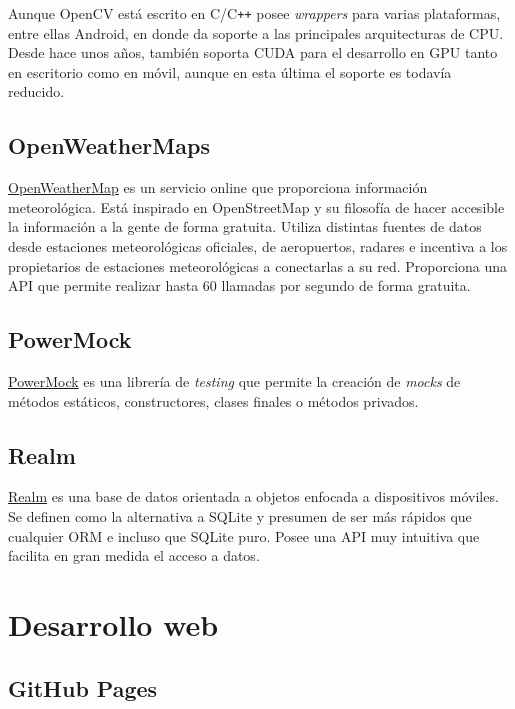 Aunque OpenCV está escrito en C/C\texttt{++} posee \emph{wrappers} para varias
plataformas, entre ellas Android, en donde da soporte a las principales
arquitecturas de CPU. Desde hace unos años, también soporta CUDA para el
desarrollo en GPU tanto en escritorio como en móvil, aunque en esta
última el soporte es todavía reducido.

\subsection{OpenWeatherMaps}\label{openweathermaps}

\href{http://openweathermap.org/}{OpenWeatherMap} es un servicio online
que proporciona información meteorológica. Está inspirado en
OpenStreetMap y su filosofía de hacer accesible la información a la
gente de forma gratuita. Utiliza distintas fuentes de datos desde
estaciones meteorológicas oficiales, de aeropuertos, radares e incentiva
a los propietarios de estaciones meteorológicas a conectarlas a su red.
Proporciona una API que permite realizar hasta 60 llamadas por segundo
de forma gratuita.

\subsection{PowerMock}\label{powermock}

\href{https://github.com/powermock/powermock}{PowerMock} es una librería
de \emph{testing} que permite la creación de \emph{mocks} de métodos
estáticos, constructores, clases finales o métodos privados.

\subsection{Realm}\label{realm}

\href{https://realm.io/products/realm-mobile-database/}{Realm} es una
base de datos orientada a objetos enfocada a dispositivos móviles. Se
definen como la alternativa a SQLite y presumen de ser más rápidos que
cualquier ORM e incluso que SQLite puro. Posee una API muy intuitiva que
facilita en gran medida el acceso a datos.

\newpage
\section{Desarrollo web}\label{pagina-web}

\subsection{GitHub Pages}\label{github-pages}

